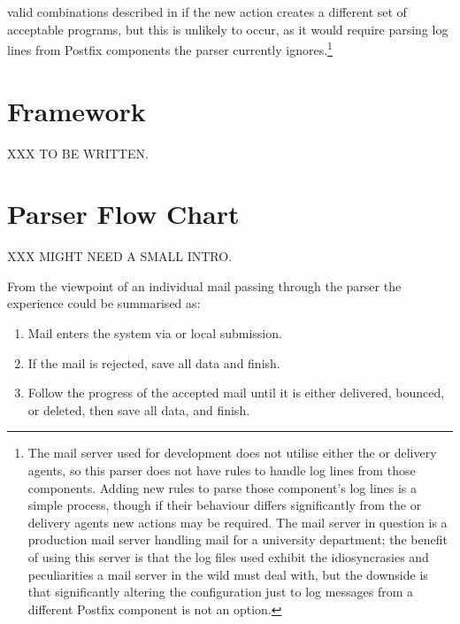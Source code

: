 valid combinations described in  if the
new action creates a different set of acceptable programs, but this is
unlikely to occur, as it would require parsing log lines from Postfix
components the parser currently ignores.\footnote{The mail server used for
development does not utilise either the  or 
delivery agents, so this parser does not have rules to handle log lines
from those components.  Adding new rules to parse those component's log
lines is a simple process, though if their behaviour differs significantly
from the  or  delivery agents new actions may be
required.  The mail server in question is a production mail server handling
mail for a university department; the benefit of using this server is that
the log files used exhibit the idiosyncrasies and peculiarities a mail
server in the wild must deal with, but the downside is that significantly
altering the configuration just to log messages from a different Postfix
component is not an option.}


\section{Framework}

XXX TO BE WRITTEN\@.


\section{Parser Flow Chart}

\label{flow-chart}

XXX MIGHT NEED A SMALL INTRO\@.

From the viewpoint of an individual mail passing through the parser the
experience could be summarised as:

\begin{enumerate}

    \item Mail enters the system via  or local submission.

    \item If the mail is rejected, save all data and finish.

    \item Follow the progress of the accepted mail until it is either
        delivered, bounced, or deleted, then save all data, and finish.

\end{enumerate}

